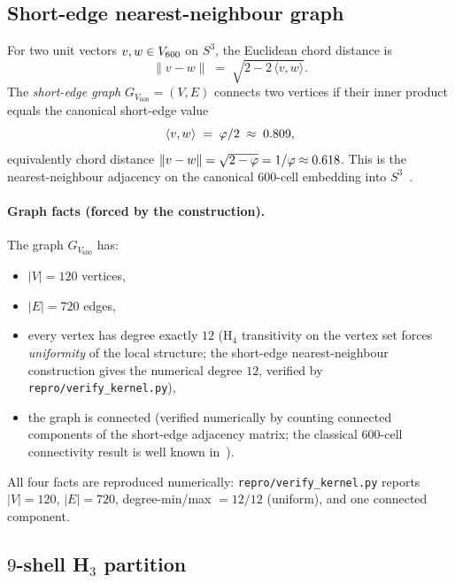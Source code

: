 \subsection{Short-edge nearest-neighbour graph}\label{ssec:graph}

For two unit vectors $v, w \in V_{600}$ on $S^{3}$, the
Euclidean chord distance is
\[
\|v - w\| \;=\; \sqrt{2 - 2\,\langle v, w\rangle}.
\]
The \emph{short-edge graph} $G_{V_{600}}=(V,E)$ connects two vertices
if their inner product equals the canonical short-edge value
\begin{equation}\label{eq:short_edge}
\langle v, w\rangle \;=\; \varphi/2 \;\approx\; 0.809,
\end{equation}
equivalently chord distance
$\|v-w\|=\sqrt{2-\varphi} = 1/\varphi \approx 0.618$. This is the
nearest-neighbour adjacency on the canonical 600-cell embedding
into $S^{3}$~\citep{CoxeterRegularPolytopes}.

\paragraph{Graph facts (forced by the construction).}
The graph $G_{V_{600}}$ has:
\begin{itemize}\itemsep=2pt
\item $|V|=120$ vertices,
\item $|E|=720$ edges,
\item every vertex has degree exactly $12$ (H$_4$ transitivity on
  the vertex set forces \emph{uniformity} of the local structure;
  the short-edge nearest-neighbour construction gives the
  numerical degree $12$, verified by
  \texttt{repro/verify\_kernel.py}),
\item the graph is connected (verified numerically by counting
  connected components of the short-edge adjacency matrix; the
  classical 600-cell connectivity result is well known
  in~\citep{CoxeterRegularPolytopes}).
\end{itemize}
All four facts are reproduced numerically:
\texttt{repro/verify\_kernel.py} reports $|V|=120$, $|E|=720$,
degree-min/max $=12/12$ (uniform), and one connected component.

\subsection{$9$-shell H$_3$ partition}\label{ssec:shells}

